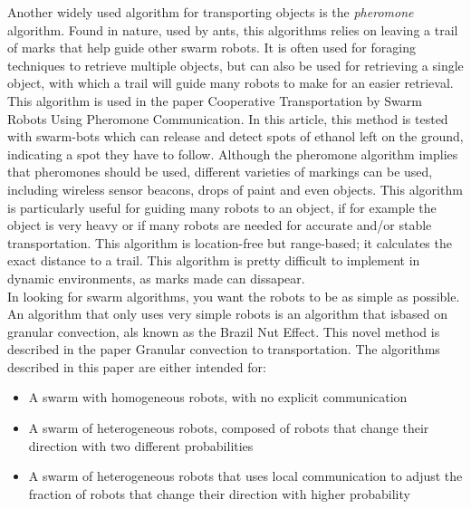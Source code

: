 Another widely used algorithm for transporting objects is the \emph{pheromone} algorithm. Found in nature, used by ants, this algorithms relies on leaving a trail of marks that help guide other swarm robots. It is often used for foraging techniques to retrieve multiple objects, but can also be used for retrieving a single object, with which  a trail will guide many robots to make for an easier retrieval. This algorithm is used in the paper Cooperative Transportation by Swarm Robots Using Pheromone Communication. \cite{Fujisawa2013} In this article, this method is tested with swarm-bots which can release and detect spots of ethanol left on the ground, indicating a spot they have to follow. Although the pheromone algorithm implies that pheromones should be used, different varieties of markings can be used, including wireless sensor beacons, drops of paint and even objects. This algorithm is particularly useful for guiding many robots to an object, if for example the object is very heavy or if many robots are needed for accurate and/or stable transportation. This algorithm is location-free but range-based; it calculates the exact distance to a trail. This algorithm is pretty difficult to implement in dynamic environments, as marks made can dissapear. \\

In looking for swarm algorithms, you want the robots to be as simple as possible. An algorithm that only uses very simple robots is an algorithm that isbased on granular convection, als known as the Brazil Nut Effect. This novel method is described in the paper Granular convection to transportation.\cite{Sugawara2012} The algorithms described in this paper are either intended for:

\begin{itemize}
	\item A swarm with homogeneous robots, with no explicit communication
	\item A swarm of heterogeneous robots, composed of robots that change their direction with two different probabilities
	\item A swarm of heterogeneous robots that uses local communication to adjust the fraction of robots that change their direction with higher probability
\end{itemize}

